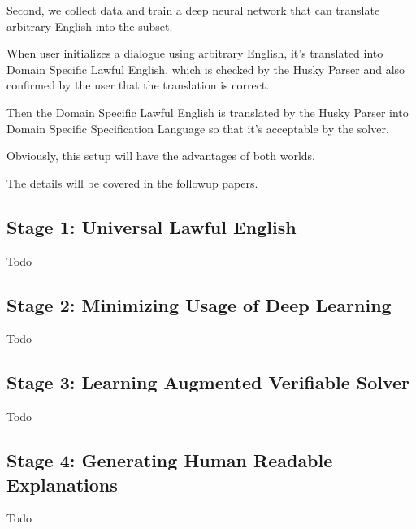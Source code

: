 \documentclass[11pt, oneside]{article}   	%
\theoremstyle{definition}
\begin{document}
Second, we collect data and train a deep neural network that can translate arbitrary English into the subset.

When user initializes a dialogue using arbitrary English, it's translated into Domain Specific Lawful English, which is checked by the Husky Parser and also confirmed by the user that the translation is correct.

Then the Domain Specific Lawful English is translated by the Husky Parser into Domain Specific Specification Language so that it's acceptable by the solver.

Obviously, this setup will have the advantages of both worlds.

The details will be covered in the followup papers.

\subsection{Stage 1: Universal Lawful English}

Todo

\subsection{Stage 2: Minimizing Usage of Deep Learning}

Todo

\subsection{Stage 3: Learning Augmented Verifiable Solver}

Todo

\subsection{Stage 4: Generating Human Readable Explanations}

Todo
\end{document}
